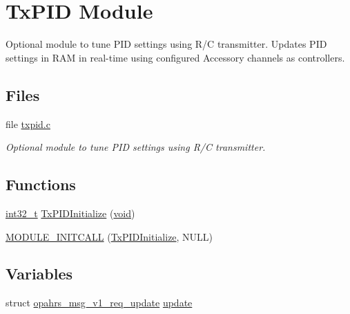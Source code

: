 \hypertarget{group___tx_p_i_d_module}{\section{Tx\-P\-I\-D Module}
\label{group___tx_p_i_d_module}
}


Optional module to tune P\-I\-D settings using R/\-C transmitter. Updates P\-I\-D settings in R\-A\-M in real-\/time using configured Accessory channels as controllers.  


\subsection*{Files}
\begin{DoxyCompactItemize}
\item 
file \hyperlink{txpid_8c}{txpid.\-c}
\begin{DoxyCompactList}\small\item\em Optional module to tune P\-I\-D settings using R/\-C transmitter. \end{DoxyCompactList}\end{DoxyCompactItemize}
\subsection*{Functions}
\begin{DoxyCompactItemize}
\item 
\hyperlink{group___n_a_m_e_gafd12020da5a235dfcf0c3c748fb5baed}{int32\-\_\-t} \hyperlink{group___tx_p_i_d_module_ga25f9f8de3b52c6d5d765abc545cdf923}{Tx\-P\-I\-D\-Initialize} (\hyperlink{group___n_a_m_e_ga18028b8badbf1ea7e704ccac3c488e82}{void})
\item 
\hyperlink{group___tx_p_i_d_module_ga4582dfc51cab82468b84a6d0f0e4eb8d}{M\-O\-D\-U\-L\-E\-\_\-\-I\-N\-I\-T\-C\-A\-L\-L} (\hyperlink{group___tx_p_i_d_module_ga25f9f8de3b52c6d5d765abc545cdf923}{Tx\-P\-I\-D\-Initialize}, N\-U\-L\-L)
\end{DoxyCompactItemize}
\subsection*{Variables}
\begin{DoxyCompactItemize}
\item 
struct \hyperlink{structopahrs__msg__v1__req__update}{opahrs\-\_\-msg\-\_\-v1\-\_\-req\-\_\-update} \hyperlink{group___tx_p_i_d_module_ga4954ac5b993eef7c92515d6a5284a4f7}{update}
\end{DoxyCompactItemize}


